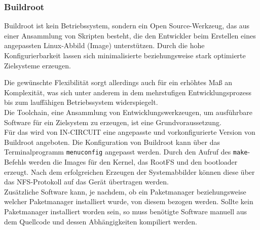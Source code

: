 \documentclass[../Bachelorarbeit.tex]{subfiles}
\begin{document}
\subsubsection*{Buildroot}
\begin{comment}
Buildroot ist kein Betriebssystem, sondern ein Open Source-Werkzeug, das aus einer Ansammlung von Skripten besteht, die den Entwickler beim Erstellen des Linux-Dateisystems unterstützen.
\end{comment}
Buildroot ist kein Betriebssystem, sondern ein Open Source-Werkzeug, das aus einer Ansammlung von Skripten besteht, die den Entwickler beim Erstellen eines angepassten Linux-Abbild (Image) unterstützen.
 Durch die hohe Konfigurierbarkeit lassen sich minimalisierte 
beziehungsweise stark optimierte Zielsysteme erzeugen. 
\begin{comment}
Die gewünschte Flexibilität sorgt allerdings auch für ein erhöhtes Maß an Komplexität, was sich unter anderem in dem mehrstufigen Entwicklungsprozess bis zum lauffähigen Betriebssystem widerspiegelt.
\end{comment}
Die gewünschte Flexibilität sorgt allerdings auch für ein erhöhtes Maß an Komplexität, was sich unter anderem in dem mehrstufigen Entwicklungsprozess bis zum lauffähigen Betriebssystem widerspiegelt.\\
Die Toolchain, eine Ansammlung von Entwicklungswerkzeugen, um ausführbare Software für ein Zielsystem zu erzeugen, ist eine Grundvoraussetzung. \\
Für das  wird von IN-CIRCUIT eine angepasste und vorkonfigurierte Version von Buildroot angeboten. 
Die Konfiguration von Buildroot kann über das Terminalprogramm 
\texttt{menuconfig} angepasst werden. Durch den Aufruf des \texttt{make}-Befehls werden die Images für den Kernel, das \ac{RootFS} und den bootloader erzeugt.
Nach dem erfolgreichen Erzeugen der Systemabbilder können diese über das \ac{NFS}-Protokoll auf das Gerät übertragen werden. \\
Zusätzliche Software kann, je nachdem, ob ein Paketmanager beziehungsweise welcher Paketmanager installiert wurde, von diesem bezogen werden. 
Sollte kein Paketmanager installiert worden sein, so muss benötigte Software manuell aus dem Quellcode und dessen Abhängigkeiten kompiliert werden.
\end{document}
